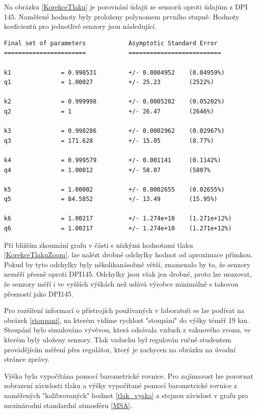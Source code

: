 \documentclass[12pt,a4paper,oneside]{article}
\begin{document}
Na obrázku \ref{KorekceTlaku} je porovnání údajů ze senzorů oproti údajům z DPI 145. Naměřené hodnoty byly proloženy polynomem prvního stupně. Hodnoty koeficientů pro jednotlivé senzory jsou následující.

\newpage

\begin{verbatim}
Final set of parameters            Asymptotic Standard Error
=======================            ==========================

k1              = 0.998531         +/- 0.0004952    (0.04959%)
q1              = 1.00027          +/- 25.23        (2522%)

k2              = 0.999998         +/- 0.0005202    (0.05202%)
q2              = 1                +/- 26.47        (2646%)

k3              = 0.998286         +/- 0.0002962    (0.02967%)
q3              = 171.628          +/- 15.05        (8.77%)

k4              = 0.999579         +/- 0.001141     (0.1142%)
q4              = 1.00012          +/- 58.07        (5807%

k5              = 1.00002          +/- 0.0002655    (0.02655%)
q5              = 84.5852          +/- 13.49        (15.95%)

k6              = 1.00217          +/- 1.274e+10    (1.271e+12%)
q6              = 1.00217          +/- 1.274e+10    (1.271e+12%)
\end{verbatim}

Při bližším zkoumání grafu v části s nízkými hodnotami tlaku \ref{KorekceTlakuZoom}, lze nalézt drobné odchylky hodnot od aproximace přímkou. Pokud by tyto odchylky byly několikanásobně větší, znamenalo by to, že senzory neměří přesně oproti DPI145. Odchylky jsou však jen drobné, proto lze usuzovat, že senzory měří i ve vyšších výškách než udává výrobce minimálně s takovou přesností jako DPI145.

Pro rozšíření informací o přístrojích používaných v laboratoři se lze podívat na obrázek \ref{stoupani}, na kterém vidíme rychlost "stoupání" do výšky téměř 19 km. Stoupání bylo simulováno vývěvou, která odsávala vzduch z vakuového zvonu, ve kterém byly uloženy senzory. Tlak vzduchu byl regulován ručně studentem provádějícím měření přes regulátor, který je zachycen na obrázku na úvodní stránce zprávy.

Výška byla vypočítána pomocí barometrické rovnice. Pro zajímavost lze porovnat zobrazení závislosti tlaku a výšky vypočítané pomocí barometrické rovnice z naměřených "kalibrovaných" hodnot \ref{tlak_vyska} a stejnou závislost v grafu pro mezinárodní standardní atmosféru \ref{MSA}. 
\end{document}
